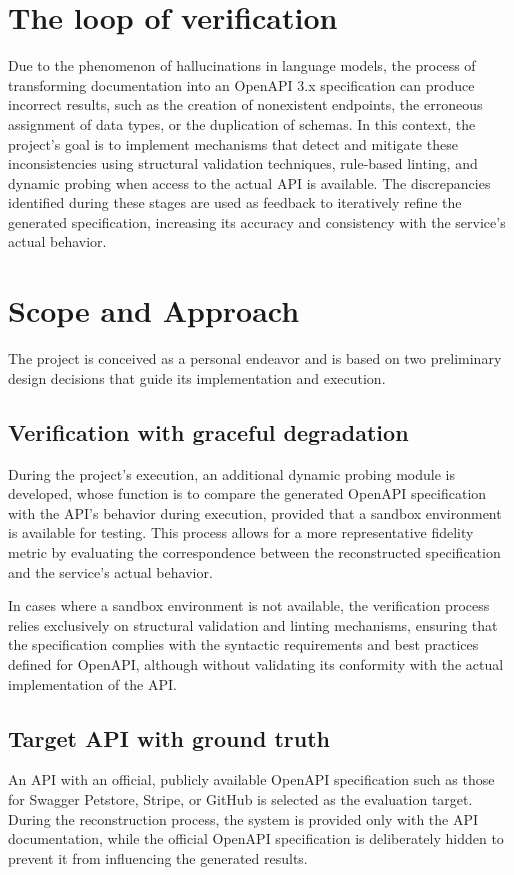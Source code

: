 \section{The loop of verification}
Due to the phenomenon of hallucinations in language models, 
the process of transforming documentation into an OpenAPI 3.x 
specification can produce incorrect results, such as the creation 
of nonexistent endpoints, the erroneous assignment of data types, 
or the duplication of schemas. In this context, the project’s goal 
is to implement mechanisms that detect and mitigate these 
inconsistencies using structural validation techniques, 
rule-based linting, and dynamic probing when access to the actual 
API is available. The discrepancies identified during these stages 
are used as feedback to iteratively refine the generated 
specification, increasing its accuracy and consistency with 
the service’s actual behavior.


\section{Scope and Approach}
The project is conceived as a personal endeavor 
and is based on two preliminary design decisions that guide
its implementation and execution.

\subsection{Verification with graceful degradation}
During the project’s execution, an additional dynamic probing 
module is developed, whose function is to compare the generated 
OpenAPI specification with the API’s behavior during execution, 
provided that a sandbox environment is available for testing. 
This process allows for a more representative fidelity metric by 
evaluating the correspondence between the reconstructed 
specification and the service’s actual behavior.

In cases where a sandbox environment is not available, 
the verification process relies exclusively on structural 
validation and linting mechanisms, ensuring that the 
specification complies with the syntactic requirements and 
best practices defined for OpenAPI, although without validating 
its conformity with the actual implementation of the API.

\subsection{Target API with ground truth}
An API with an official, publicly available OpenAPI specification
such as those for Swagger Petstore, Stripe, or GitHub is 
selected as the evaluation target. During the reconstruction 
process, the system is provided only with the API documentation, 
while the official OpenAPI specification is deliberately hidden 
to prevent it from influencing the generated results.

